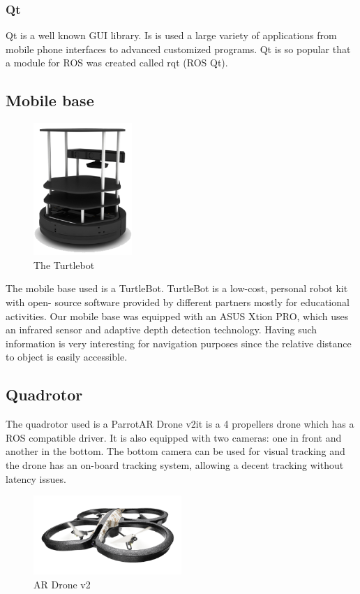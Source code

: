\documentclass[11pt,a4paper,twocolumn]{article}
\begin{document}
\subsubsection{Qt}
Qt is a well known GUI library. Is is used a large variety of applications from mobile phone interfaces to advanced customized programs. Qt is so popular that a module for ROS was
created called rqt (ROS Qt).


\subsection{Mobile base}
\begin{figure}[ht]	
\centering
\includegraphics[height=5cm]{turtlebot.png}
\caption{The Turtlebot}
\end{figure}

The mobile base used is a TurtleBot. TurtleBot is a low-cost, personal robot kit with open-
source software
provided by different partners mostly for educational activities.
Our mobile base was equipped with an ASUS Xtion PRO, which uses an infrared sensor and adaptive depth detection technology. Having such information is very interesting for 
navigation
purposes since the relative distance to object is easily accessible.


\subsection{Quadrotor}

The quadrotor used is a Parrot\textcopyright AR Drone v2\texttrademark it is a 4 propellers
drone which has a ROS compatible driver. It is also equipped with two cameras: one in front
and another in the bottom. The bottom camera can be used for visual tracking and the drone
has an on-board tracking system, allowing a decent tracking without latency issues.

\begin{figure}[ht]	
\centering
\includegraphics[height=3cm]{arDroneGpsEdition.png}
\caption{AR Drone v2}
\end{figure}
\end{document}
